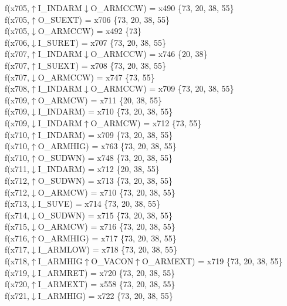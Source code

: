 f(x705,$\uparrow$I\_INDARM$\downarrow$O\_ARMCCW) = x490 \{73, 20, 38, 55\} \\  
f(x705,$\uparrow$O\_SUEXT) = x706 \{73, 20, 38, 55\} \\  
f(x705,$\downarrow$O\_ARMCCW) = x492 \{73\} \\  
f(x706,$\downarrow$I\_SURET) = x707 \{73, 20, 38, 55\} \\  
f(x707,$\uparrow$I\_INDARM$\downarrow$O\_ARMCCW) = x746 \{20, 38\} \\  
f(x707,$\uparrow$I\_SUEXT) = x708 \{73, 20, 38, 55\} \\  
f(x707,$\downarrow$O\_ARMCCW) = x747 \{73, 55\} \\  
f(x708,$\uparrow$I\_INDARM$\downarrow$O\_ARMCCW) = x709 \{73, 20, 38, 55\} \\  
f(x709,$\uparrow$O\_ARMCW) = x711 \{20, 38, 55\} \\  
f(x709,$\downarrow$I\_INDARM) = x710 \{73, 20, 38, 55\} \\  
f(x709,$\downarrow$I\_INDARM$\uparrow$O\_ARMCW) = x712 \{73, 55\} \\  
f(x710,$\uparrow$I\_INDARM) = x709 \{73, 20, 38, 55\} \\  
f(x710,$\uparrow$O\_ARMHIG) = x763 \{73, 20, 38, 55\} \\  
f(x710,$\uparrow$O\_SUDWN) = x748 \{73, 20, 38, 55\} \\  
f(x711,$\downarrow$I\_INDARM) = x712 \{20, 38, 55\} \\  
f(x712,$\uparrow$O\_SUDWN) = x713 \{73, 20, 38, 55\} \\  
f(x712,$\downarrow$O\_ARMCW) = x710 \{73, 20, 38, 55\} \\  
f(x713,$\downarrow$I\_SUVE) = x714 \{73, 20, 38, 55\} \\  
f(x714,$\downarrow$O\_SUDWN) = x715 \{73, 20, 38, 55\} \\  
f(x715,$\downarrow$O\_ARMCW) = x716 \{73, 20, 38, 55\} \\  
f(x716,$\uparrow$O\_ARMHIG) = x717 \{73, 20, 38, 55\} \\  
f(x717,$\downarrow$I\_ARMLOW) = x718 \{73, 20, 38, 55\} \\  
f(x718,$\uparrow$I\_ARMHIG$\uparrow$O\_VACON$\uparrow$O\_ARMEXT) = x719 \{73, 20, 38, 55\} \\  
f(x719,$\downarrow$I\_ARMRET) = x720 \{73, 20, 38, 55\} \\  
f(x720,$\uparrow$I\_ARMEXT) = x558 \{73, 20, 38, 55\} \\  
f(x721,$\downarrow$I\_ARMHIG) = x722 \{73, 20, 38, 55\} \\  
